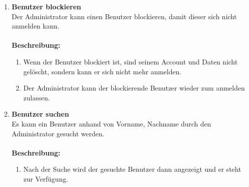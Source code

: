 \documentclass[parskip=full,11pt]{scrartcl}
\def\threedigits#1{%
  \ifnum#1<10 0\fi
  \ifnum#1<1 0\fi
  \number#1}
\begin{document}
\begin{enumerate}[label={\textbf{/F\protect\threedigits{\theenumi}0/}}, leftmargin=*, resume]
\item \label{FAA6} \colorbox{shadecolor} {\textbf{Benutzer blockieren}}\\ Der Administrator kann einen Benutzer blockieren, damit dieser sich nicht anmelden kann.\\\\
\textbf{Beschreibung:}\\
\begin{enumerate}[label=(\arabic*), leftmargin=*]
	\item Wenn der Benutzer blockiert ist, sind seinem Account und Daten nicht gelöscht, sondern kann er sich nicht mehr anmelden.\\
	\item Der Administrator kann der blockierende Benutzer wieder zum anmelden zulassen. \\ 
	\end{enumerate}


\item \label{FAA7} \colorbox{shadecolor} {\textbf{Benutzer suchen}}\\  Es kann ein Benutzer anhand von Vorname, Nachname durch den Administrator gesucht werden.\\\\
\textbf{Beschreibung:}\\
\begin{enumerate}[label=(\arabic*), leftmargin=*]
	\item Nach der Suche wird der gesuchte Benutzer dann angezeigt und er steht zur Verfügung.\\
	\end{enumerate}
\end{enumerate}
\end{document}

